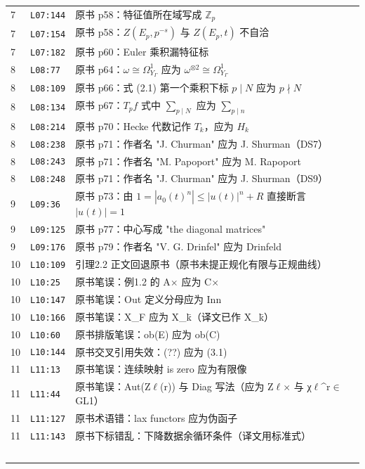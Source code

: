 \begin{longtable}{@{}p{1.0cm}p{2.2cm}p{10.6cm}@{}}
7 & \texttt{L07:144} & 原书 p58：特征值所在域写成 $\mathbb{Z}_p$ \\
7 & \texttt{L07:154} & 原书 p58：$Z(E_p,p^{-s})$ 与 $Z(E_p,t)$ 不自洽 \\
7 & \texttt{L07:182} & 原书 p60：Euler 乘积漏特征标 \\
8 & \texttt{L08:77} & 原书 p64：$\omega\cong\Omega^1_{Y_\Gamma}$ 应为 $\omega^{\otimes2}\cong\Omega^1_{Y_\Gamma}$ \\
8 & \texttt{L08:109} & 原书 p66：式 (2.1) 第一个乘积下标 $p\mid N$ 应为 $p\nmid N$ \\
8 & \texttt{L08:134} & 原书 p67：$T_pf$ 式中 $\sum_{p\mid N}$ 应为 $\sum_{p\mid n}$ \\
8 & \texttt{L08:214} & 原书 p70：Hecke 代数记作 $T_k$，应为 $H_k$ \\
8 & \texttt{L08:238} & 原书 p71：作者名 "J. Churman" 应为 J. Shurman（DS7） \\
8 & \texttt{L08:243} & 原书 p71：作者名 "M. Papoport" 应为 M. Rapoport \\
8 & \texttt{L08:248} & 原书 p71：作者名 "J. Churman" 应为 J. Shurman（DS9） \\
9 & \texttt{L09:36} & 原书 p73：由 $1=|a_0(t)^n|\leq|u(t)|^n+R$ 直接断言 $|u(t)|=1$ \\
9 & \texttt{L09:125} & 原书 p77：中心写成 "the diagonal matrices" \\
9 & \texttt{L09:176} & 原书 p79：作者名 "V. G. Drinfel" 应为 Drinfeld \\
10 & \texttt{L10:109} & 引理2.2 正文回退原书（原书未提正规化有限与正规曲线） \\
10 & \texttt{L10:25} & 原书笔误：例1.2 的 A$\times$ 应为 C$\times$ \\
10 & \texttt{L10:147} & 原书笔误：Out 定义分母应为 Inn \\
10 & \texttt{L10:166} & 原书笔误：X\_F 应为 X\_k̄（译文已作 X\_k̄） \\
10 & \texttt{L10:60} & 原书排版笔误：ob(E) 应为 ob(C) \\
10 & \texttt{L10:144} & 原书交叉引用失效：(??) 应为 (3.1) \\
11 & \texttt{L11:13} & 原书笔误：连续映射 is zero 应为有限像 \\
11 & \texttt{L11:44} & 原书笔误：Aut(Z$\ell$(r)) 与 Diag 写法（应为 Z$\ell$$\times$ 与 χ$\ell$\^{}r$\in$GL1） \\
11 & \texttt{L11:127} & 原书术语错：lax functors 应为伪函子 \\
11 & \texttt{L11:143} & 原书下标错乱：下降数据余循环条件（译文用标准式） \\
$$
\end{longtable}
